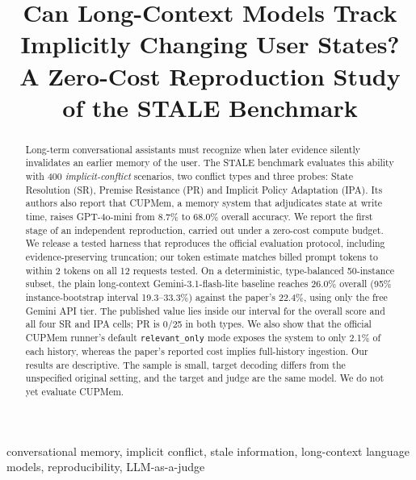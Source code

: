 \documentclass[conference]{IEEEtran}
\newcommand{\code}[1]{\texttt{\small #1}}
\begin{document}
\title{Can Long-Context Models Track Implicitly Changing User States?\\
A Zero-Cost Reproduction Study of the STALE Benchmark}

\author{
}

\maketitle

\begin{abstract}
Long-term conversational assistants must recognize when later evidence silently invalidates an earlier memory of the user. The STALE benchmark evaluates this ability with 400 \emph{implicit-conflict} scenarios, two conflict types and three probes: State Resolution (SR), Premise Resistance (PR) and Implicit Policy Adaptation (IPA). Its authors also report that CUPMem, a memory system that adjudicates state at write time, raises GPT-4o-mini from 8.7\% to 68.0\% overall accuracy. We report the first stage of an independent reproduction, carried out under a zero-cost compute budget. We release a tested harness that reproduces the official evaluation protocol, including evidence-preserving truncation; our token estimate matches billed prompt tokens to within 2 tokens on all 12 requests tested. On a deterministic, type-balanced 50-instance subset, the plain long-context Gemini-3.1-flash-lite baseline reaches 26.0\% overall (95\% instance-bootstrap interval 19.3--33.3\%) against the paper's 22.4\%, using only the free Gemini API tier. The published value lies inside our interval for the overall score and all four SR and IPA cells; PR is 0/25 in both types. We also show that the official CUPMem runner's default \code{relevant\_only} mode exposes the system to only 2.1\% of each history, whereas the paper's reported cost implies full-history ingestion. Our results are descriptive. The sample is small, target decoding differs from the unspecified original setting, and the target and judge are the same model. We do not yet evaluate CUPMem.
\end{abstract}

\begin{IEEEkeywords}
conversational memory, implicit conflict, stale information, long-context language models, reproducibility, LLM-as-a-judge
\end{IEEEkeywords}
\end{document}
